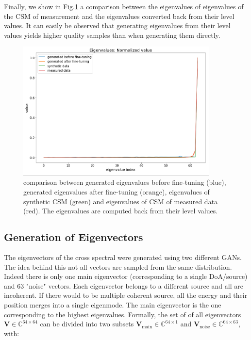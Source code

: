 \documentclass{article}
\begin{document}
Finally, we show in Fig.\ref{fig:evals_dB_not_level_sample_comparison} a comparison between the eigenvalues of eigenvalues of the CSM of measurement and the eigenvalues converted back from their level values. It can easily be observed that generating eigenvalues from their level values yields higher quality samples than when generating them directly.


\begin{figure}
    \centering
    \includegraphics[width=0.9\textwidth]{../figs/evals_dB_not_level_sample_comparison.png}    
    \caption{comparison between generated eigenvalues before fine-tuning (blue), generated eigenvalues after fine-tuning (orange), eigenvalues of synthetic CSM (green) and eigenvalues of CSM of measured data (red). The eigenvalues are computed back from their level values.}
    \label{fig:evals_dB_not_level_sample_comparison}
\end{figure} 


\subsection{Generation of Eigenvectors}

The eigenvectors of the cross spectral were generated using two different GANs. The idea behind this not all vectors are sampled from the same distribution. Indeed there is only one main eigenvector (corresponding to a single DoA/source) and 63 "noise" vectors.  Each eigenvector belongs to a different source and all are incoherent. If there would to be  multiple coherent source, all the energy and their position merges into a single eigenmode. The main eigenvector is the one corresponding to the highest eigenvalues. Formally, the set of of all eigenvectors $\mathbf{V} \in \mathbb{C}^{64 \times 64}$ can be divided into two subsets $\mathbf{V}_{\text{main}} \in \mathbb{C}^{64 \times 1}$ and $\mathbf{V}_{\text{noise}} \in \mathbb{C}^{64 \times 63}$, with:
\end{document}
